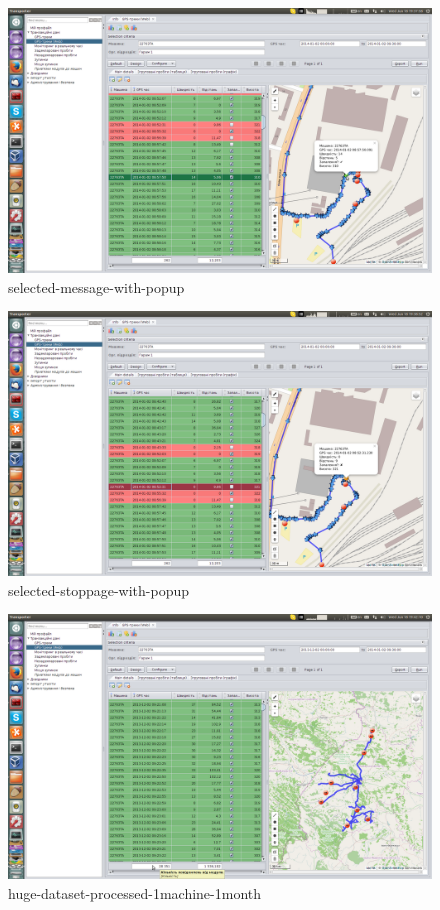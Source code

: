 \begin{figure}[!htp]
\centering
\includegraphics[width=16cm]{chapters/02-gpstracks/images/16-selected-message-with-popup.png}
\caption{selected-message-with-popup}\label{fig:16}
\end{figure}

\begin{figure}[!htp]
\centering
\includegraphics[width=16cm]{chapters/02-gpstracks/images/17-selected-stoppage-with-popup.png}
\caption{selected-stoppage-with-popup}\label{fig:17}
\end{figure}

\begin{figure}[!htp]
\centering
\includegraphics[width=16cm]{chapters/02-gpstracks/images/18-huge-dataset-processed-1machine-1month.png}
\caption{huge-dataset-processed-1machine-1month}\label{fig:18}
\end{figure}

